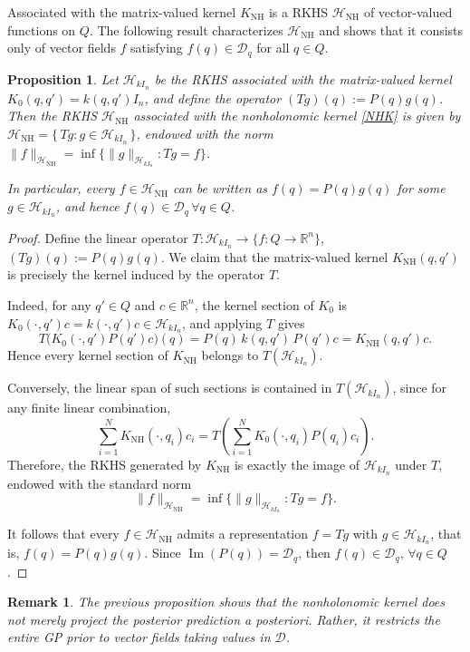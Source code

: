 \documentclass[letterpaper, 10 pt, conference]{ieeeconf}
\newtheorem{remark}{Remark}
\newtheorem{proposition}{Proposition}
\newcommand{\D}{\mathcal{D}}
\begin{document}
Associated with the matrix-valued kernel $K_{\mathrm{NH}}$ is a RKHS $\mathcal H_{\mathrm{NH}}$ of vector-valued functions on $Q$. The following result characterizes $\mathcal H_{\mathrm{NH}}$ and shows that it consists only of vector fields $f$ satisfying $f(q)\in \mathcal D_q$ for all $q\in Q$.



\begin{proposition}
Let $\mathcal H_{kI_n}$ be the RKHS associated with the matrix-valued kernel
$K_0(q,q')=k(q,q')I_n$, and define the operator $(Tg)(q):=P(q)g(q)$.
Then the RKHS $\mathcal H_{\mathrm{NH}}$ associated with the nonholonomic kernel \eqref{NHK} is given by $\mathcal H_{\mathrm{NH}}
=
\{\, Tg : g\in \mathcal H_{kI_n}\,\}$, endowed with the norm $\|f\|_{\mathcal H_{\mathrm{NH}}}
=
\inf\{\|g\|_{\mathcal H_{kI_n}}: Tg=f\}$.

In particular, every $f\in\mathcal H_{\mathrm{NH}}$ can be written as $f(q)=P(q)g(q)$ for some $g\in\mathcal H_{kI_n}$, and hence $f(q)\in \mathcal D_q
\,
\forall q\in Q$.
\end{proposition}

\begin{proof}
Define the linear operator $T:\mathcal H_{kI_n}\to \{f:Q\to\mathbb R^n\}$,
$(Tg)(q):=P(q)g(q)$. We claim that the matrix-valued kernel $K_{\mathrm{NH}}(q,q')$ is precisely the kernel induced by the operator $T$.

Indeed, for any $q'\in Q$ and $c\in\mathbb R^n$, the kernel section of $K_0$ is
$K_0(\cdot,q')c = k(\cdot,q')c \in \mathcal H_{kI_n}$, and applying $T$ gives
\[
T\bigl(K_0(\cdot,q')P(q')c\bigr)(q)
=
P(q)\,k(q,q')\,P(q')c
=
K_{\mathrm{NH}}(q,q')c.
\]
Hence every kernel section of $K_{\mathrm{NH}}$ belongs to $T(\mathcal H_{kI_n})$.

Conversely, the linear span of such sections is contained in $T(\mathcal H_{kI_n})$, since for any finite linear combination,
\[
\sum_{i=1}^N K_{\mathrm{NH}}(\cdot,q_i)c_i
=
T\left(
\sum_{i=1}^N K_0(\cdot,q_i)P(q_i)c_i
\right).
\]
Therefore, the RKHS generated by $K_{\mathrm{NH}}$ is exactly the image of $\mathcal H_{kI_n}$ under $T$, endowed with the standard norm
\[
\|f\|_{\mathcal H_{\mathrm{NH}}}
=
\inf\{\|g\|_{\mathcal H_{kI_n}}: Tg=f\}.
\]

It follows that every $f\in\mathcal H_{\mathrm{NH}}$ admits a representation
$f=Tg$ with $g\in\mathcal H_{kI_n}$, that is, $f(q)=P(q)g(q)$. Since $\operatorname{Im}(P(q))=\mathcal D_q$, then $f(q)\in \mathcal D_q$, $\forall q\in Q$.
\end{proof}
\begin{remark}
The previous proposition shows that the nonholonomic kernel does not merely project the posterior prediction a posteriori. Rather, it restricts the entire GP prior to vector fields taking values in $\D$.
\end{remark}
\end{document}
